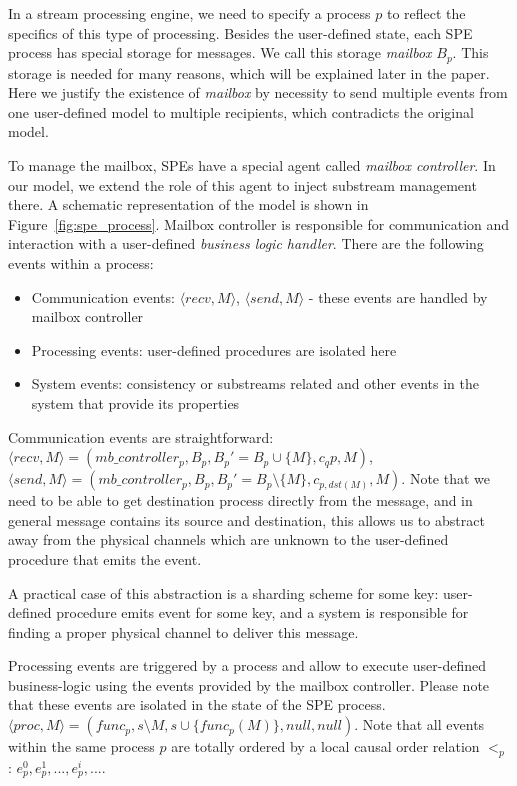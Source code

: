 In a stream processing engine, we need to specify a process $p$ to reflect the specifics of this type of processing. Besides the user-defined state, each SPE process has special storage for messages. We call this storage \textit{mailbox} $B_p$. This storage is needed for many reasons, which will be explained later in the paper. Here we justify the existence of \textit{mailbox} by necessity to send multiple events from one user-defined model to multiple recipients, which contradicts the original model. 

To manage the mailbox, SPEs have a special agent called {\em mailbox controller}. In our model, we extend the role of this agent to inject substream management there. A schematic representation of the model is shown in Figure~\ref{fig:spe_process}. Mailbox controller is responsible for communication and interaction with a user-defined {\em business logic handler}. There are the following events within a process:
\begin{itemize}
    \item Communication events:  $\langle recv, M\rangle$, $\langle send, M \rangle$ - these events are handled by mailbox controller
    \item Processing events: user-defined procedures are isolated here
    \item System events: consistency or substreams related and other events in the system that provide its properties
\end{itemize}

Communication events are straightforward: $\langle recv, M\rangle = (mb\_controller_p, B_p, B_p' = B_p\cup \{M\}, c_qp, M)$, $\langle send, M \rangle = (mb\_controller_p, B_p, B_p' = B_p\setminus\{M\}, c_{p, dst(M)}, M)$. Note that we need to be able to get destination process directly from the message, and in general message contains its source and destination, this allows us to abstract away from the physical channels which are unknown to the user-defined procedure that emits the event. 

A practical case of this abstraction is a sharding scheme for some key: user-defined procedure emits event for some key, and a system is responsible for finding a proper physical channel to deliver this message.

Processing events are triggered by a process and allow to execute user-defined business-logic using the events provided by the mailbox controller. Please note that these events are isolated in the state of the SPE process. $\langle proc, M\rangle = (func_p, s\setminus M, s \cup \{func_p(M)\}, null, null)$. Note that all events within the same process $p$ are totally ordered by a local causal order relation $<_p$: $e^{0}_p,e^{1}_p,...,e^{i}_p,...$. 

